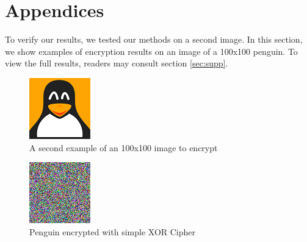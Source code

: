 \documentclass[10pt]{article}
\begin{document}
    \renewcommand{\thesection}{\Alph{section}}
    \setcounter{section}{0}
    
    \section{Appendices} \label{sec:app}
    
    To verify our results, we tested our methods on a second image. In this section, we show examples of encryption results on an image of a 100x100 penguin. To view the full results, readers may consult section \ref{sec:supp}.
    
    \begin{figure}[htbp]
    	\centering
    	\includegraphics[width=0.5\columnwidth]{penguin.png}
    	\caption{A second example of an 100x100 image to encrypt}
    	\label{fig15}
    \end{figure}
    
    
    
     \begin{figure}[htbp]
    	\centering
    	\includegraphics[width=0.5\columnwidth]{simplePenguinEncrypted.png}
    	\caption{Penguin encrypted with simple XOR Cipher}
    	\label{fig16}
    \end{figure}
    
\end{document}
